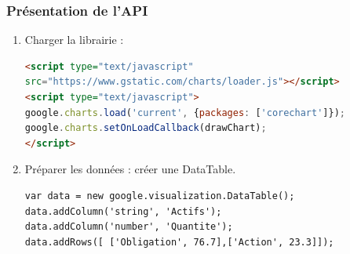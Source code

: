 
\begin{frame} [fragile]
    \frametitle{Présentation de l'API}
    \begin{enumerate}
     \item Charger la librairie :
\begin{lstlisting}[language=HTML, basicstyle=\scriptsize] 
<script type="text/javascript"
src="https://www.gstatic.com/charts/loader.js"></script>
<script type="text/javascript">
google.charts.load('current', {packages: ['corechart']});
google.charts.setOnLoadCallback(drawChart);
</script>
\end{lstlisting}	
     \item Préparer les données : créer une DataTable.
\begin{lstlisting}[language=HTML, basicstyle=\scriptsize] 
var data = new google.visualization.DataTable();
data.addColumn('string', 'Actifs');
data.addColumn('number', 'Quantite');
data.addRows([ ['Obligation', 76.7],['Action', 23.3]]);
\end{lstlisting}
 
    \end{enumerate}
\end{frame}

